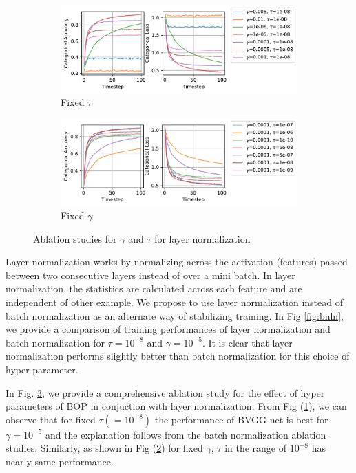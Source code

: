 \begin{figure}[!ht]
\centering
    \begin{subfigure}{0.98\textwidth}
        \includegraphics[width=1.\linewidth]{fig/AccuracyLossLNfixedtau.pdf}
        \caption{Fixed $\tau$}
        \label{lnfixedtau}
    \end{subfigure}
    \begin{subfigure}{0.98\textwidth}
        \includegraphics[width=1.\linewidth]{fig/AccuracyLossLNfixedgamma.pdf}
        \caption{Fixed $\gamma$}
        \label{lnfixedgamma}
    \end{subfigure}
    \caption{Ablation studies for $\gamma$ and $\tau$ for layer normalization} \label{fig:ln_ablation}
\end{figure}

Layer normalization works by normalizing across the activation (features) passed between two consecutive layers instead of over a mini batch. In layer normalization, the statistics are calculated across each feature and are independent of other example. We propose to use layer normalization instead of batch normalization as an alternate way of stabilizing training. In Fig \ref{fig:bnln}, we provide a comparison of training performances of layer normalization and batch normalization for $\tau=10^{-8}$ and $\gamma=10^{-5}$. It is clear that layer normalization performs slightly better than batch normalization for this choice of hyper parameter. 


In Fig. \ref{fig:ln_ablation}, we provide a comprehensive ablation study for the effect of hyper parameters of BOP in conjuction with layer normalization. From Fig (\ref{lnfixedtau}), we can observe that for fixed $\tau(=10^{-8})$ the performance of BVGG net is best for $\gamma=10^{-5}$ and the explanation follows from the batch normalization ablation studies. Similarly, as shown in Fig (\ref{lnfixedgamma}) for fixed $\gamma$, $\tau$ in the range of $10^{-8}$ has nearly same performance.

